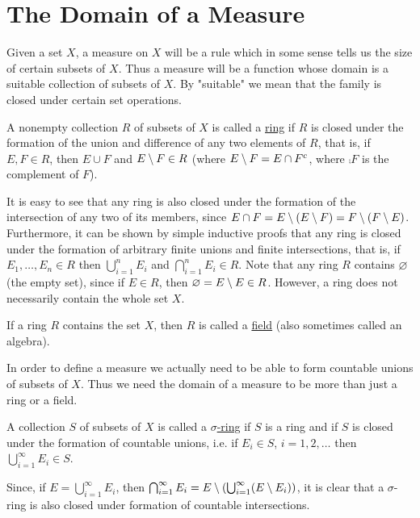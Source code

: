 


\section{The Domain of a Measure}

Given a set $X$, a measure on $X$ will be a rule which in some sense tells us the size of certain subsets of $X$. Thus a measure will be a function whose domain is a suitable collection of subsets of $X$. By "suitable" we mean that the family is closed under certain set operations.

\begin{definition}
A nonempty collection $R$ of subsets of $X$ is called a \underline{ring} if $R$ is closed under the formation of the union and difference of any two elements of $R$, that is, if $E,F\in R$, then $E\cup F$ and $E\setminus F\in R$ (where $E\setminus F=E\cap{F}^c$, where $\comp{F}$ is the complement of $F$). 
\end{definition}

It is easy to see that any ring is also closed under the formation of the intersection of any two of its members, since $E\cap F=E\setminus(E\setminus F) = F\setminus (F\setminus E)$. Furthermore, it can be shown by simple inductive proofs that any ring is closed under the formation of arbitrary finite unions and finite intersections, that is, if $E_1,\dots,E_n\in R$ then $\bigcup_{i=1}^nE_i$ and $\bigcap_{i=1}^nE_i\in R$. Note that any ring $R$ contains $\varnothing$ (the empty set), since if $E\in R$, then $\varnothing=E\setminus E\in R$. However, a ring does not necessarily contain the whole set $X$.

\begin{definition}
If a ring $R$ contains the set $X$, then $R$ is called a \underline{field} (also sometimes called an algebra).
\end{definition}

In order to define a measure we actually need to be able to form countable unions of subsets of $X$. Thus we need the domain of a measure to be more than just a ring or a field.

\begin{definition}
A collection $S$ of subsets of $X$ is called a \underline{$\sigma$-ring} if $S$ is a ring and if $S$ is closed under the formation of countable unions, i.e. if $E_i\in S$, $i=1,2,\dots$ then $\bigcup_{i=1}^\infty E_i\in S$.
\end{definition}

Since, if $E=\bigcup_{i=1}^\infty E_i$, then $\bigcap_{i=1}^\infty E_i=E\setminus\left(\bigcup_{i=1}^\infty(E\setminus E_i)\right)$, it is clear that a $\sigma$-ring is also closed under formation of countable intersections.

